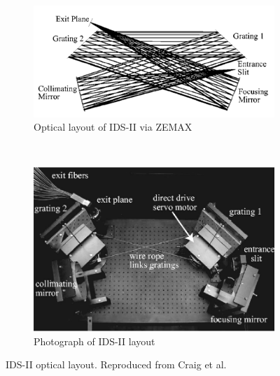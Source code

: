 \begin{figure}[!htb]
	\centering
    \begin{subfigure}[t]{0.5\textwidth}
        \centering
        \includegraphics[width = \textwidth]{implementation/diagnostics/idsii_trace.png}
        \caption{Optical layout of IDS-II via ZEMAX}
    \end{subfigure}%
    ~ 
    \begin{subfigure}[t]{0.5\textwidth}
        \centering
        \includegraphics[width = \textwidth]{implementation/diagnostics/idsii_photo.png}
        \caption{Photograph of IDS-II layout}
    \end{subfigure}
	\label{fig:IDS-II}
	\caption[IDS-II optical layout]{IDS-II optical layout. Reproduced from Craig et al. \cite{Craig}}
\end{figure}

